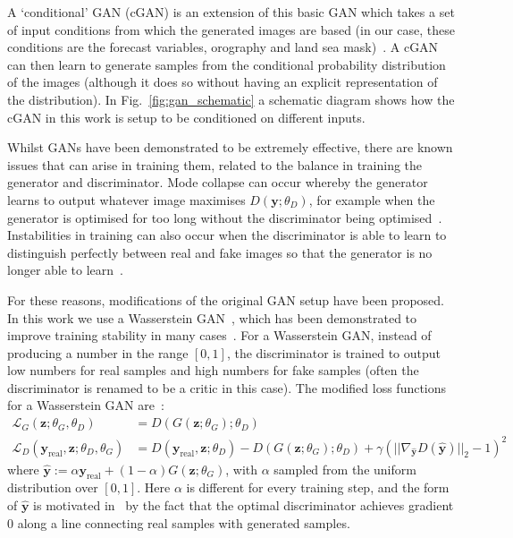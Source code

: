 \documentclass[../main.tex]{subfiles}
\begin{document}
A `conditional' GAN (cGAN) is an extension of this basic GAN which takes a set of input conditions from which the generated images are based (in our case, these conditions are the forecast variables, orography and land sea mask)~\citep{mirza_conditional_2014}. A cGAN can then learn to generate samples from the conditional probability distribution of the images (although it does so without having an explicit representation of the distribution). In Fig.~\ref{fig:gan_schematic} a schematic diagram shows how the cGAN in this work is setup to be conditioned on different inputs.

Whilst GANs have been demonstrated to be extremely effective, there are known issues that can arise in training them, related to the balance in training the generator and discriminator. Mode collapse can occur whereby the generator learns to output whatever image maximises $D(\mathbf{y};\theta_D)$, for example when the generator is optimised for too long without the discriminator being optimised~\citep{goodfellow_generative_2014}. Instabilities in training can also occur when the discriminator is able to learn to distinguish perfectly between real and fake images so that the generator is no longer able to learn~\citep{arjovsky_towards_2016}.

For these reasons, modifications of the original GAN setup have been proposed. In this work we use a Wasserstein GAN~\citep{arjovsky_wasserstein_2017}, which has been demonstrated to improve training stability in many cases~\citep{creswell_generative_2018}. For a Wasserstein GAN, instead of producing a number in the range $[0,1]$, the discriminator is trained to output low numbers for real samples and high numbers for fake samples (often the discriminator is renamed to be a critic in this case). The modified loss functions for a Wasserstein GAN are~\citep{gulrajani_improved_2017}:
\begin{align}
\mathcal{L}_G (\mathbf{z} ; \theta_G, \theta_D) &=  D( G(\mathbf{z} ; \theta_G) ; \theta_D) \\
\mathcal{L}_D(\mathbf{y}_{\text{real}}, \mathbf{z}; \theta_D, \theta_G) &= D(\mathbf{y}_{\text{real}}, \mathbf{z} ; \theta_D) 
- D(G(\mathbf{z};\theta_G); \theta_D) + \gamma \left( || \nabla_{\hat{\mathbf{y}}} D(\hat{\mathbf{y}})||_2 - 1\right)^2
\end{align}
where $\hat{\mathbf{y}} := \alpha\mathbf{y}_{\text{real}} + (1-\alpha) G(\mathbf{z};\theta_G)$, with $\alpha$ sampled from the uniform distribution over $[0,1]$. Here $\alpha$ is different for every training step, and the form of $\hat{\mathbf{y}}$ is motivated in~\cite{gulrajani_improved_2017} by the fact that the optimal discriminator achieves gradient 0 along a line connecting real samples with generated samples. 
\end{document}
